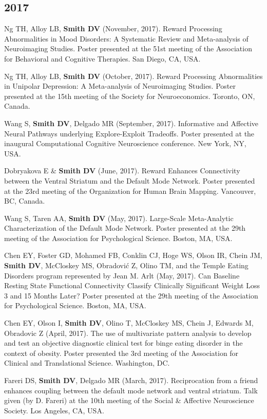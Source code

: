 \documentclass[11pt, letterpaper]{article}
\begin{document}
\subsection*{2017}
\begin{hangparas}{.5in}{1}
Ng TH, Alloy LB, \textbf{Smith DV} (November, 2017). Reward Processing Abnormalities in Mood Disorders: A Systematic Review and Meta-analysis of Neuroimaging Studies. Poster presented at the 51st meeting of the Association for Behavioral and Cognitive Therapies. San Diego, CA, USA.

Ng TH, Alloy LB, \textbf{Smith DV} (October, 2017). Reward Processing Abnormalities in Unipolar Depression: A Meta-analysis of Neuroimaging Studies. Poster presented at the 15th meeting of the Society for Neuroeconomics. Toronto, ON, Canada.

Wang S, \textbf{Smith DV}, Delgado MR (September, 2017). Informative and Affective Neural Pathways underlying Explore-Exploit Tradeoffs. Poster presented at the inaugural Computational Cognitive Neuroscience conference. New York, NY, USA.

Dobryakova E \& \textbf{Smith DV} (June, 2017). Reward Enhances Connectivity between the Ventral Striatum and the Default Mode Network. Poster presented at the 23rd meeting of the Organization for Human Brain Mapping. Vancouver, BC, Canada.

Wang  S, Taren AA, \textbf{Smith DV} (May, 2017). Large-Scale Meta-Analytic Characterization of the Default Mode Network. Poster presented at the 29th meeting of the Association for Psychological Science. Boston, MA, USA.

Chen EY, Foster GD, Mohamed FB, Conklin CJ, Hoge WS, Olson IR, Chein JM, \textbf{Smith DV}, McCloskey MS, Obradović Z, Olino TM, and the Temple Eating Disorders program represented by Jean M. Arlt (May, 2017). Can Baseline Resting State Functional Connectivity Classify Clinically Significant Weight Loss 3 and 15 Months Later? Poster presented at the 29th meeting of the Association for Psychological Science. Boston, MA, USA.

Chen EY, Olson I, \textbf{Smith DV}, Olino T, McCloskey MS, Chein J, Edwards M, Obradovic Z  (April, 2017). The use of multivariate pattern analysis to develop and test an objective diagnostic clinical test for binge eating disorder in the context of obesity. Poster presented the 3rd meeting of the Association for Clinical and Translational Science. Washington, DC.

Fareri DS, \textbf{Smith DV}, Delgado MR (March, 2017). Reciprocation from a friend enhances coupling between the default mode network and ventral striatum. Talk given (by D. Fareri) at the 10th meeting of the Social \& Affective Neuroscience Society. Los Angeles, CA, USA. \\

\end{hangparas}
\end{document}
